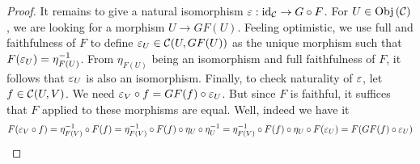\begin{proof}
  It remains to give a natural isomorphism $\varepsilon : \mathrm{id}_{\mathcal{C}} \to G \circ F$.
  For $U \in \mathrm{Obj}\left(\mathcal{C}\right)$, we are looking for a morphism $U \to GF(U)$.
  Feeling optimistic, we use full and faithfulness of $F$ to define 
  $\varepsilon_U \in \mathcal{C}(U, GF(U))$ as the unique morphism such that 
  $F(\varepsilon_U) = \eta_{F(U)} ^{-1}$. 
  From $\eta_{F(U)}$ being an isomorphism and full faithfulness of $F$, 
  it follows that $\varepsilon_U$ is also an isomorphism. 
  Finally, to check naturality of $\varepsilon$, 
  let $f \in \mathcal{C}(U,V)$.
  We need $\varepsilon_V \circ f = GF(f) \circ \varepsilon_U$.
  But since $F$ is faithful, 
  it suffices that $F$ applied to these morphisms are equal. 
  Well, indeed we have it \[
    F(\varepsilon_V \circ f) = \eta_{F(V)}^{-1} \circ F(f)
    = \eta_{F(V)}^{-1} \circ F(f) \circ \eta_U \circ \eta_U^{-1} 
    = \eta_{F(V)}^{-1} \circ F(f) \circ \eta_U \circ F(\varepsilon_U)
    = F(GF(f) \circ \varepsilon_U)
  \]
\end{proof}

